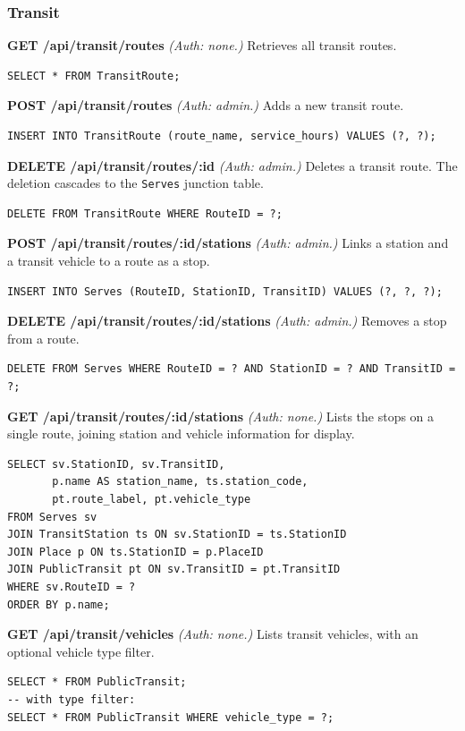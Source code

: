 \subsubsection{Transit}

\textbf{GET /api/transit/routes} \textit{(Auth: none.)}
Retrieves all transit routes.
\begin{lstlisting}[language=MySQL]
SELECT * FROM TransitRoute;
\end{lstlisting}

\textbf{POST /api/transit/routes} \textit{(Auth: admin.)}
Adds a new transit route.
\begin{lstlisting}[language=MySQL]
INSERT INTO TransitRoute (route_name, service_hours) VALUES (?, ?);
\end{lstlisting}

\textbf{DELETE /api/transit/routes/:id} \textit{(Auth: admin.)}
Deletes a transit route. The deletion cascades to the \texttt{Serves} junction table.
\begin{lstlisting}[language=MySQL]
DELETE FROM TransitRoute WHERE RouteID = ?;
\end{lstlisting}

\textbf{POST /api/transit/routes/:id/stations} \textit{(Auth: admin.)}
Links a station and a transit vehicle to a route as a stop.
\begin{lstlisting}[language=MySQL]
INSERT INTO Serves (RouteID, StationID, TransitID) VALUES (?, ?, ?);
\end{lstlisting}

\textbf{DELETE /api/transit/routes/:id/stations} \textit{(Auth: admin.)}
Removes a stop from a route.
\begin{lstlisting}[language=MySQL]
DELETE FROM Serves WHERE RouteID = ? AND StationID = ? AND TransitID = ?;
\end{lstlisting}

\textbf{GET /api/transit/routes/:id/stations} \textit{(Auth: none.)}
Lists the stops on a single route, joining station and vehicle information for display.
\begin{lstlisting}[language=MySQL]
SELECT sv.StationID, sv.TransitID,
       p.name AS station_name, ts.station_code,
       pt.route_label, pt.vehicle_type
FROM Serves sv
JOIN TransitStation ts ON sv.StationID = ts.StationID
JOIN Place p ON ts.StationID = p.PlaceID
JOIN PublicTransit pt ON sv.TransitID = pt.TransitID
WHERE sv.RouteID = ?
ORDER BY p.name;
\end{lstlisting}

\textbf{GET /api/transit/vehicles} \textit{(Auth: none.)}
Lists transit vehicles, with an optional vehicle type filter.
\begin{lstlisting}[language=MySQL]
SELECT * FROM PublicTransit;
-- with type filter:
SELECT * FROM PublicTransit WHERE vehicle_type = ?;
\end{lstlisting}

